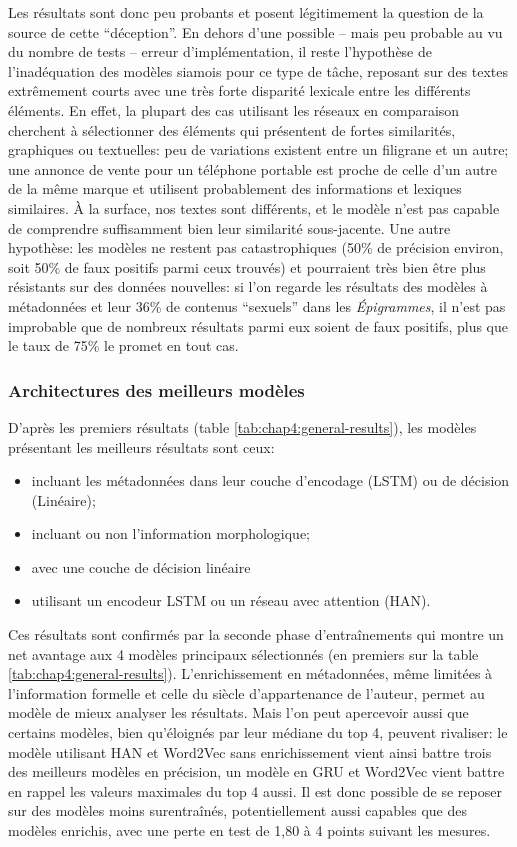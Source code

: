 Les résultats sont donc peu probants et posent légitimement la question de la source de cette \enquote{déception}. En dehors d'une possible -- mais peu probable au vu du nombre de tests -- erreur d'implémentation, il reste l'hypothèse de l'inadéquation des modèles siamois pour ce type de tâche, reposant sur des textes extrêmement courts avec une très forte disparité lexicale entre les différents éléments. En effet, la plupart des cas utilisant les réseaux en comparaison cherchent à sélectionner des éléments qui présentent de fortes similarités, graphiques ou textuelles: peu de variations existent entre un filigrane et un autre; une annonce de vente pour un téléphone portable est proche de celle d'un autre de la même marque et utilisent probablement des informations et lexiques similaires. À la surface, nos textes sont différents, et le modèle n'est pas capable de comprendre suffisamment bien leur similarité sous-jacente. Une autre hypothèse: les modèles ne restent pas catastrophiques (50\% de précision environ, soit 50\% de faux positifs parmi ceux trouvés) et pourraient très bien être plus résistants sur des données nouvelles: si l'on regarde les résultats des modèles à métadonnées et leur 36\% de contenus \enquote{sexuels} dans les \textit{Épigrammes}, il n'est pas improbable que de nombreux résultats parmi eux soient de faux positifs, plus que le taux de 75\% le promet en tout cas.

\subsubsection{Architectures des meilleurs modèles}

D'après les premiers résultats (table \ref{tab:chap4:general-results}), les modèles présentant les meilleurs résultats sont ceux:
\begin{itemize}
    \item incluant les métadonnées dans leur couche d'encodage (LSTM) ou de décision (Linéaire);
    \item incluant ou non l'information morphologique;
    \item avec une couche de décision linéaire
    \item utilisant un encodeur LSTM ou un réseau avec attention (HAN).
\end{itemize}

Ces résultats sont confirmés par la seconde phase d'entraînements qui montre un net avantage aux 4 modèles principaux sélectionnés (en premiers sur la table \ref{tab:chap4:general-results}). L'enrichissement en métadonnées, même limitées à l'information formelle et celle du siècle d'appartenance de l'auteur, permet au modèle de mieux analyser les résultats. Mais l'on peut apercevoir aussi que certains modèles, bien qu'éloignés par leur médiane du top 4, peuvent rivaliser: le modèle utilisant HAN et Word2Vec sans enrichissement vient ainsi battre trois des meilleurs modèles en précision, un modèle en GRU et Word2Vec vient battre en rappel les valeurs maximales du top 4 aussi. Il est donc possible de se reposer sur des modèles moins surentraînés, potentiellement aussi capables que des modèles enrichis, avec une perte en test de 1,80 à 4 points suivant les mesures.

